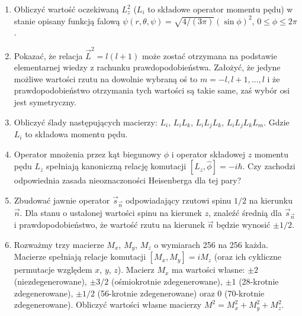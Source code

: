 \documentclass[a4paper,11pt]{article}
\begin{document}
\begin{enumerate}
\item Obliczyć wartość oczekiwaną $L_{ z }^{ 2 }$ ($L_{ i }$ to
  składowe operator momentu pędu) w stanie opisany funkcją falową
  $\psi( r, \theta, \psi ) = \sqrt{ 4 / ( 3 \pi ) } ( \sin \phi )^{ 2
  }$, $0 \leq \phi \leq 2\pi$.



\item Pokazać, że relacja $\vec{ L }^{ 2 } = l ( l + 1 )$ może zostać
  otrzymana na podstawie elementarnej wiedzy z rachunku
  prawdopodobieństwa. Założyć, że jedyne możliwe wartości rzutu na
  dowolnie wybraną oś to $m = -l, l + 1, \ldots, l$ i że
  prawdopodobieństwo otrzymania tych wartości są takie same, zaś wybór
  osi jest symetryczny.



\item Obliczyć ślady następujących macierzy: $L_{ i }$,
  $L_{ i } L_{ k }$, $L_{ i } L_{ j } L_{ k }$,
  $L_{ i } L_{ j } L_{ k } L_{ m }$. Gdzie $L_{ i }$ to składowa
  momentu pędu.



\item Operator mnożenia przez kąt biegunowy $\phi$ i operator
  składowej $z$ momentu pędu $L_{ z }$ spełniają kanoniczną relację
  komutacji $[ L_{ z }, \widehat{ \phi } ] = -i\hbar$. Czy zachodzi
  odpowiednia zasada nieoznaczoności Heisenberga dla tej pary?



\item Zbudować jawnie operator $\vec{ s }_{ \vec{ n } }$ odpowiadający
  rzutowi spinu $1 / 2$ na kierunku $\vec{ n }$. Dla stanu o ustalonej
  wartości spinu na kierunek $z$, znaleźć średnią dla
  $\vec{ s }_{ \vec{ n } }$ i prawdopodobieństwo, że wartość rzutu na
  kierunek $\vec{ n }$ będzie wynosić $\pm 1 / 2$.

\item Rozważmy trzy macierze $M_{ x }$, $M_{ y }$, $M_{ z }$ o
  wymiarach 256 na 256 każda. Macierze spełniają relacje komutacji
  $[ M_{ x }, M_{ y } ] = i M_{ z }$ (oraz ich cykliczne permutacje
  względem $x$, $y$, $z$). Macierz $M_{ x }$ ma wartości własne:
  $\pm 2$ (niezdegenerowane), $\pm 3 / 2$ (ośmiokrotnie
  zdegenerowane), $\pm 1$ (28-krotnie zdegenerowane), $\pm 1 / 2$
  (56-krotnie zdegenerowane) oraz 0 (70-krotnie zdegenerowane).
  Obliczyć wartości własne macierzy
  $M^{ 2 } = M_{ x }^{ 2 } + M_{ y }^{ 2 } + M_{ z }^{ 2 }$.




\end{enumerate}
\end{document}
